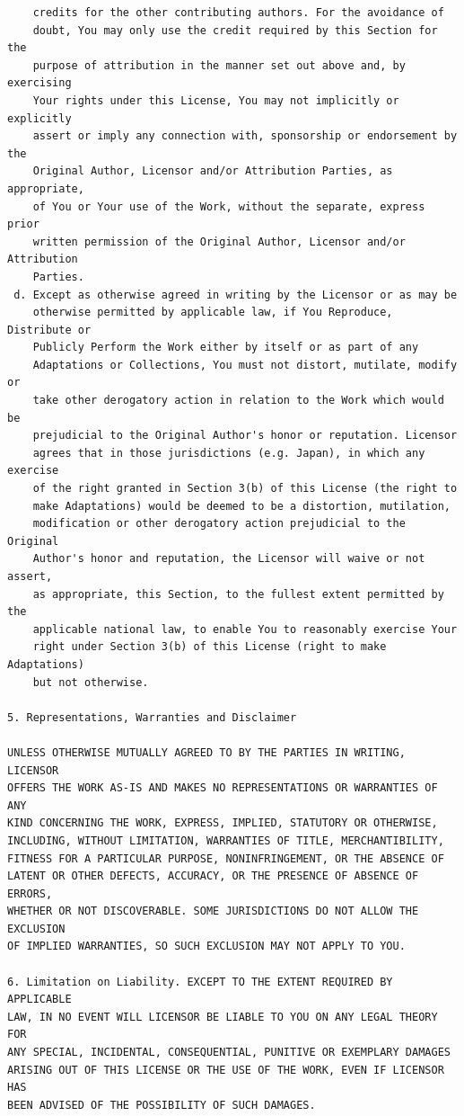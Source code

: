 \documentclass[10pt]{book}              %
\begin{document}
\begin{appendices}
\begin{verbatim}
    credits for the other contributing authors. For the avoidance of
    doubt, You may only use the credit required by this Section for the
    purpose of attribution in the manner set out above and, by exercising
    Your rights under this License, You may not implicitly or explicitly
    assert or imply any connection with, sponsorship or endorsement by the
    Original Author, Licensor and/or Attribution Parties, as appropriate,
    of You or Your use of the Work, without the separate, express prior
    written permission of the Original Author, Licensor and/or Attribution
    Parties.
 d. Except as otherwise agreed in writing by the Licensor or as may be
    otherwise permitted by applicable law, if You Reproduce, Distribute or
    Publicly Perform the Work either by itself or as part of any
    Adaptations or Collections, You must not distort, mutilate, modify or
    take other derogatory action in relation to the Work which would be
    prejudicial to the Original Author's honor or reputation. Licensor
    agrees that in those jurisdictions (e.g. Japan), in which any exercise
    of the right granted in Section 3(b) of this License (the right to
    make Adaptations) would be deemed to be a distortion, mutilation,
    modification or other derogatory action prejudicial to the Original
    Author's honor and reputation, the Licensor will waive or not assert,
    as appropriate, this Section, to the fullest extent permitted by the
    applicable national law, to enable You to reasonably exercise Your
    right under Section 3(b) of this License (right to make Adaptations)
    but not otherwise.

5. Representations, Warranties and Disclaimer

UNLESS OTHERWISE MUTUALLY AGREED TO BY THE PARTIES IN WRITING, LICENSOR
OFFERS THE WORK AS-IS AND MAKES NO REPRESENTATIONS OR WARRANTIES OF ANY
KIND CONCERNING THE WORK, EXPRESS, IMPLIED, STATUTORY OR OTHERWISE,
INCLUDING, WITHOUT LIMITATION, WARRANTIES OF TITLE, MERCHANTIBILITY,
FITNESS FOR A PARTICULAR PURPOSE, NONINFRINGEMENT, OR THE ABSENCE OF
LATENT OR OTHER DEFECTS, ACCURACY, OR THE PRESENCE OF ABSENCE OF ERRORS,
WHETHER OR NOT DISCOVERABLE. SOME JURISDICTIONS DO NOT ALLOW THE EXCLUSION
OF IMPLIED WARRANTIES, SO SUCH EXCLUSION MAY NOT APPLY TO YOU.

6. Limitation on Liability. EXCEPT TO THE EXTENT REQUIRED BY APPLICABLE
LAW, IN NO EVENT WILL LICENSOR BE LIABLE TO YOU ON ANY LEGAL THEORY FOR
ANY SPECIAL, INCIDENTAL, CONSEQUENTIAL, PUNITIVE OR EXEMPLARY DAMAGES
ARISING OUT OF THIS LICENSE OR THE USE OF THE WORK, EVEN IF LICENSOR HAS
BEEN ADVISED OF THE POSSIBILITY OF SUCH DAMAGES.


\end{verbatim}
\end{appendices}
\end{document}
